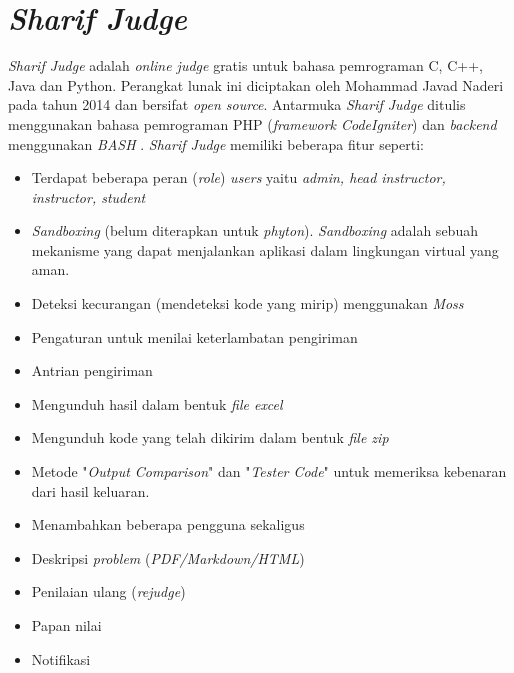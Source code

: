 
\section{\textit{Sharif Judge}}
\label{sec:sharifjudge} 

\textit{Sharif Judge} adalah \textit{online judge} gratis untuk bahasa pemrograman C, C++, Java dan Python. Perangkat lunak ini diciptakan oleh Mohammad Javad Naderi pada tahun 2014 dan bersifat \textit{open source}. Antarmuka \textit{Sharif Judge} ditulis menggunakan bahasa pemrograman PHP (\textit{framework CodeIgniter}) dan \textit{backend} menggunakan \textit{BASH} \cite{mjnaderi:14:sharifjudge}.
\textit{Sharif Judge} memiliki beberapa fitur seperti:
\begin{itemize}
	\item Terdapat beberapa peran (\textit{role}) \textit{users} yaitu \textit{admin, head instructor, instructor, student}
	\item \textit{Sandboxing} (belum diterapkan untuk \textit{phyton}). \textit{Sandboxing} adalah sebuah mekanisme yang dapat menjalankan aplikasi dalam lingkungan virtual yang aman.
	\item Deteksi kecurangan (mendeteksi kode yang mirip) menggunakan \textit{Moss}
	\item Pengaturan untuk menilai keterlambatan pengiriman
	\item Antrian pengiriman
	\item Mengunduh hasil dalam bentuk \textit{file excel}
	\item Mengunduh kode yang telah dikirim dalam bentuk \textit{file zip}
	\item Metode "\textit{Output Comparison}" dan "\textit{Tester Code}" untuk memeriksa kebenaran dari hasil keluaran.
	\item Menambahkan beberapa pengguna sekaligus
	\item Deskripsi \textit{problem} (\textit{PDF/Markdown/HTML})
	\item Penilaian ulang (\textit{rejudge})
	\item Papan nilai
	\item Notifikasi
\end{itemize}

